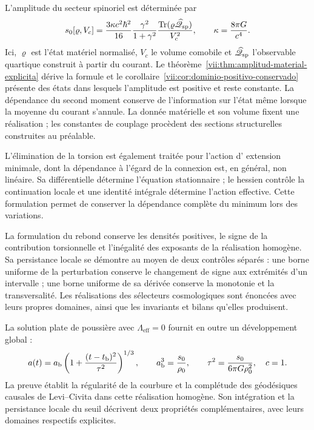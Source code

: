 L'amplitude du secteur spinoriel est déterminée par
\begin{equation}
 s_0[\varrho,V_c]
 =\frac{3\kappa c^2\hbar^2}{16}
   \frac{\gamma^2}{1+\gamma^2}
   \frac{\operatorname{Tr}
    (\varrho\widehat{\mathscr Q}_{\rm sp})}{V_c^2},
 \qquad \kappa=\frac{8\pi G}{c^4}.
 \label{vii:eq:programa-amplitud}
\end{equation}
Ici, \(\varrho\) est l'état matériel normalisé, \(V_c\) le volume
comobile et \(\widehat{\mathscr Q}_{\rm sp}\) l'observable quartique
construit à partir du courant. Le
théorème~\ref{vii:thm:amplitud-material-explicita} dérive la formule et
le corollaire~\ref{vii:cor:dominio-positivo-conservado} présente des états
dans lesquels l'amplitude est positive et reste constante. La dépendance
du second moment conserve de l'information sur l'état même lorsque la
moyenne du courant s'annule. La donnée matérielle et son volume fixent une
réalisation ; les constantes de couplage procèdent des sections
structurelles construites au préalable.

L'élimination de la torsion est également traitée pour l'action d'
extension minimale, dont la dépendance à l'égard de la connexion est, en
général, non linéaire. Sa différentielle détermine l'équation stationnaire ;
le hessien contrôle la continuation locale et une identité intégrale
détermine l'action effective. Cette formulation permet de conserver la
dépendance complète du minimum lors des variations.

La formulation du rebond conserve les densités positives, le signe de
la contribution torsionnelle et l'inégalité des exposants de la réalisation
homogène. Sa persistance locale se démontre au moyen de deux contrôles
séparés : une borne uniforme de la perturbation conserve le changement de
signe aux extrémités d'un intervalle ; une borne uniforme de sa dérivée
conserve la monotonie et la transversalité. Les réalisations des
sélecteurs cosmologiques sont énoncées avec leurs propres domaines, ainsi que les
invariants et bilans qu'elles produisent.

La solution plate de poussière avec \(\Lambda_{\mathrm{eff}}=0\)
fournit en outre un développement global :
\[
 a(t)=a_{\rm b}\left(1+
       \frac{(t-t_{\rm b})^2}{\tau^2}\right)^{1/3},
 \qquad
 a_{\rm b}^3=\frac{s_0}{\rho_0},\qquad
 \tau^2=\frac{s_0}{6\pi G\rho_0^2},
 \quad c=1.
\]
La preuve établit la régularité de la courbure et la complétude des
géodésiques causales de Levi--Civita dans cette réalisation homogène.
Son intégration et la persistance locale
du seuil décrivent deux propriétés complémentaires, avec leurs
domaines respectifs explicites.

